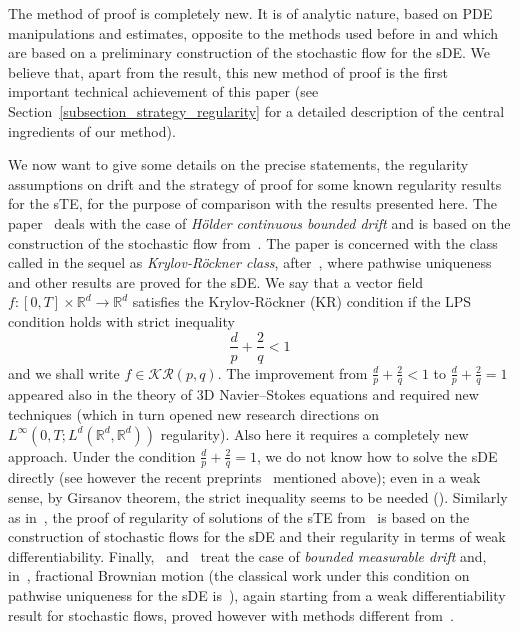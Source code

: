 \documentclass[a4paper,10pt]{article}
\newcommand\1{\mathbbm{1}}
\numberwithin{equation}{section}
\begin{document}
The method of proof is completely new. It is of analytic nature, based on PDE manipulations and estimates, opposite to the methods used before in \cite{FlGuPr4,FeFl,MoPrTh} and which are based on a preliminary construction of the stochastic flow for the sDE. We believe that, apart from the result, this new method of proof is the first important technical achievement of this paper (see Section~\ref{subsection_strategy_regularity} for a detailed description of the central ingredients of our method).

We now want to give some details on the precise statements, the regularity assumptions on drift and the strategy of proof for some known regularity results for the sTE, for the purpose of comparison with the results presented here. The paper~\cite{FlGuPr4} deals with the case of \textit{H\"{o}lder continuous bounded drift} and is based on the construction of the stochastic flow from~\cite{FLAGUBPRI11}. The paper \cite{FeFl} is concerned with the class called in the sequel as \textit{Krylov-R\"{o}ckner class}, after~\cite{KRYROE05}, where pathwise uniqueness and other results are proved for the sDE. We say that a vector field $f \colon [ 0,T] \times\mathbb{R}^{d}\rightarrow\mathbb{R}^{d}$ satisfies the Krylov-R\"{o}ckner (KR) condition if the LPS condition holds with strict inequality
\begin{equation*}
\frac{d}{p}+\frac{2}{q}<1  
\end{equation*}
and we shall write $f\in\mathcal{KR}(p,q)$. The improvement from $\frac{d}{p}+\frac{2}{q}<1$ to $\frac{d}{p}+\frac{2}{q}=1$ appeared also in the theory of 3D Navier--Stokes equations and required new techniques (which in turn opened new research directions on $L^{\infty}(0,T;L^{d}(\mathbb{R}^{d},\mathbb{R}^{d}) )$ regularity). Also here it requires a completely new approach. Under the condition $\frac{d}{p}+\frac {2}{q}=1$, we do not know how to solve the sDE directly  (see however the recent preprints~\cite{Nam,WLW} mentioned above); even in a weak sense, by Girsanov theorem, the strict inequality seems to be needed (\cite{KRYROE05,Po,GYOMAR01}). Similarly as in~\cite{FlGuPr4}, the proof of regularity of solutions of the sTE from~\cite{FeFl} is based on the construction of stochastic flows for the sDE and their regularity in terms of weak differentiability. Finally,~\cite{MoPrTh} and~\cite{Nil16} treat the case of \emph{bounded measurable drift} and, in~\cite{Nil16}, fractional Brownian motion (the classical work under this condition on pathwise uniqueness for the sDE is~\cite{Ve}), again starting from a weak differentiability result for stochastic flows, proved however with methods different from~\cite{FeFl}.
\end{document}
